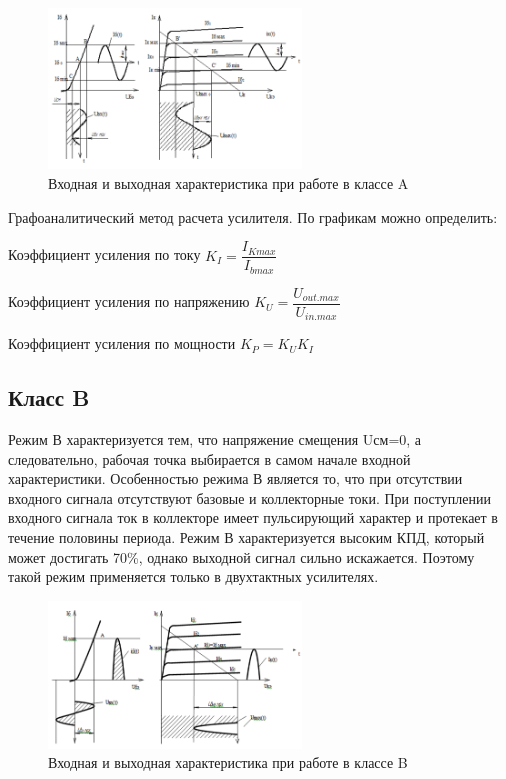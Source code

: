 \documentclass[unicode, 12pt, a4paper, oneside]{article}
\begin{document}
\begin{figure}[H]
\centering
\includegraphics[width=0.6\textwidth]{20_GAA.png}
\caption{Входная и выходная характеристика при работе в классе A}
\label{fig:20_GAA}
\end{figure}

Графоаналитический метод расчета усилителя. По графикам можно определить:

Коэффициент усиления по току $K_I = \dfrac{I_{Kmax}}{I_{bmax}}$

Коэффициент усиления по напряжению $K_U = \dfrac{U_{out.max}}{U_{in.max}}$

Коэффициент усиления по мощности $K_P = K_U K_I$

\subsection*{Класс B}

Режим В характеризуется тем, что напряжение смещения Uсм=0, а следовательно, рабочая точка выбирается в самом начале входной характеристики. Особенностью режима В является то, что при отсутствии входного сигнала отсутствуют базовые и коллекторные токи. 
При поступлении входного сигнала ток в коллекторе имеет пульсирующий характер и протекает в течение половины периода. Режим В характеризуется высоким КПД, который может достигать 70\%, однако выходной сигнал сильно искажается. Поэтому такой режим применяется только в двухтактных усилителях.

\begin{figure}[H]
\centering
\includegraphics[width=0.6\textwidth]{20_GAB.png}
\caption{Входная и выходная характеристика при работе в классе B}
\label{fig:20_GAB}
\end{figure}
\end{document}

